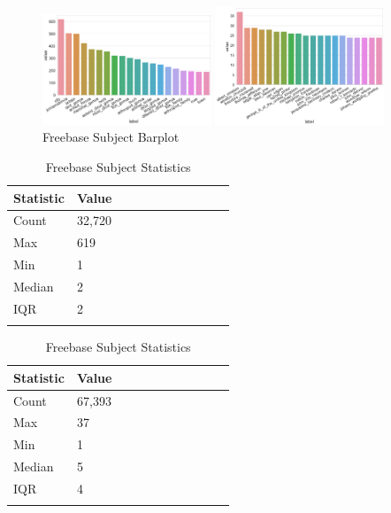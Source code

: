 
\begin{figure}[H]
	\parbox{.5\linewidth}{
   		\centering
    		\includegraphics[width=0.45\textwidth, height=0.2\textheight]{Wordnet_Subject_Counts}
		\caption{Wordnet Subject Barplot}
		}
	\hfill
	\parbox{.5\linewidth}{
   		\centering
		\includegraphics[width=0.45\textwidth, height=0.2\textheight]{Freebase_Subject_Counts}
		\caption{Freebase Subject Barplot}
		}
\end{figure}

\begin{table}[H]
	\parbox{.5\linewidth}{
		\centering
		\begin{tabular}{lllllllllll}
  			\textbf{Statistic} & \textbf{Value}  \\
  			\hline
			Count & 32,720 \\
			Max & 619 \\
			Min & 1 \\
  			Median & 2 \\
  			IQR & 2 \\
				&
		\end{tabular}
		\caption{Wordnet Subject Statistics}
		}
	\hfill
	\parbox{.5\linewidth}{
		\centering
		\begin{tabular}{lllllllllll}
  			\textbf{Statistic} & \textbf{Value}  \\
  			\hline
			Count & 67,393 \\
			Max & 37 \\
			Min & 1 \\
  			Median & 5 \\
  			IQR & 4 \\
				&
		\end{tabular}
		\caption{Freebase Subject Statistics}
		}
\end{table}

